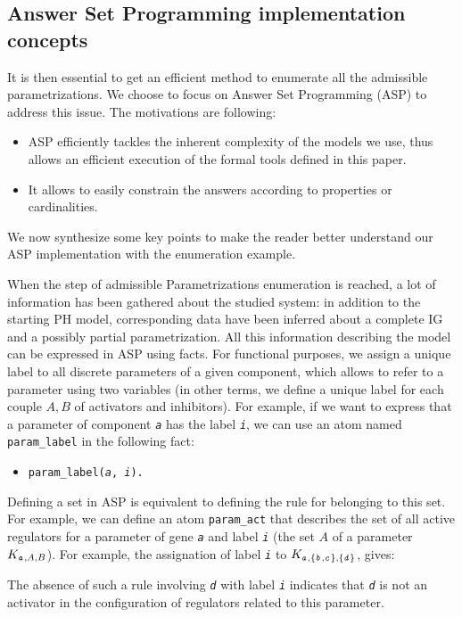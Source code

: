 \subsection{Answer Set Programming implementation concepts}

\newcommand{\ti}[1]{\texttt{\textit{#1}}}
\newcommand{\aspil}[1]{\texttt{#1}}
\newcommand{\asp}[1]{\begin{itemize} \item[] \aspil{#1} \end{itemize}}

It is then essential to get an efficient method to enumerate all the admissible parametrizations. We choose to focus on Answer Set Programming (ASP) \cite{Baral03} to address this issue. The motivations are following: 
\begin{itemize}
\item ASP efficiently tackles the inherent complexity of the models we use, thus allows an efficient execution of the formal tools defined in this paper.
\item It allows to easily constrain the answers according to properties or cardinalities.
\end{itemize}
We now synthesize some key points to make the reader better understand our ASP implementation with the enumeration example.

When the step of admissible Parametrizations enumeration is reached, a lot of information has been gathered about the studied system: in addition to the starting PH model, corresponding data have been inferred about a complete IG and a possibly partial parametrization.
All this information describing the model can be expressed in ASP using facts.
For functional purposes, we assign a unique label to all discrete parameters of a given component, which allows to refer to a parameter using two variables (in other terms, we define a unique label for each couple $A,B$ of activators and inhibitors).
For example, if we want to express that a parameter of component \ti{a} has the label \ti{i}, we can use an atom named \aspil{param\_label} in the following fact:
\asp{param\_label(\ti{a}, \ti{i}).}

Defining a set in ASP is equivalent to defining the rule for belonging to this set. For example, we can define an atom \aspil{param\_act} that describes the set of all active regulators for a parameter of gene \ti{a} and label \ti{i} (\ie the set $A$ of a parameter $K_{\ti{a},A,B}$). For example, the assignation of label \ti{i} to $K_{\ti{a},\{\ti{b},\ti{c}\},\{\ti{d}\}}$, gives:
\asp{param\_act(\ti{a}, \ti{i}, \ti{b}). \item[] param\_act(\ti{a}, \ti{i}, \ti{c}).}
The absence of such a rule involving \ti{d} with label \ti{i} indicates that \ti{d} is not an activator in the configuration of regulators related to this parameter.

